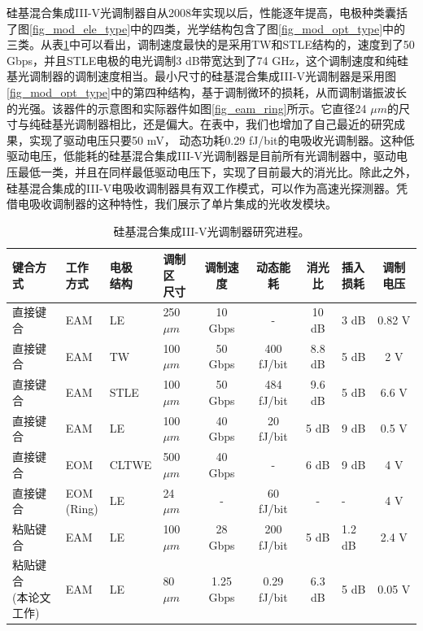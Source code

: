 硅基混合集成III-V光调制器自从2008年实现以后，性能逐年提高，电极种类囊括了图\ref{fig_mod_ele_type}中的四类，光学结构包含了图\ref{fig_mod_opt_type}中的三类。从表\ref{sil_IIIV_mod}中可以看出，调制速度最快的是采用TW和STLE结构的，速度到了50 Gbps，并且STLE电极的电光调制3 dB带宽达到了74 GHz\cite{tang2012over}，这个调制速度和纯硅基光调制器的调制速度相当。最小尺寸的硅基混合集成III-V光调制器是采用图\ref{fig_mod_opt_type}中的第四种结构，基于调制微环的损耗，从而调制谐振波长的光强。该器件的示意图和实际器件如图\ref{fig_eam_ring}所示\cite{Srinivasan2012micro}。它直径24 $\mu m$的尺寸与纯硅基光调制器相比，还是偏大。在表中，我们也增加了自己最近的研究成果，实现了驱动电压只要50 mV， 动态功耗0.29 fJ/bit的电吸收光调制器。这种低驱动电压，低能耗的硅基混合集成III-V光调制器是目前所有光调制器中，驱动电压最低一类，并且在同样最低驱动电压下，实现了目前最大的消光比。除此之外，硅基混合集成的III-V电吸收调制器具有双工作模式，可以作为高速光探测器。凭借电吸收调制器的这种特性，我们展示了单片集成的光收发模块\cite{chen2016wavelength}。
{
	\begin{table}[htb]
		\caption{硅基混合集成III-V光调制器研究进程。}
		\label{sil_IIIV_mod}
		\centering
		\begin{tabular}[t]{p{2cm}p{1cm}p{1cm}p{1.2cm}cccp{1cm}c}
			\hline
			键合方式  & \tabincell{c}{工作 \\ 方式} &\tabincell{c}{电极 \\ 结构}  & \tabincell{c}{调制区 \\ 尺寸} & 调制速度 & 动态能耗 & 消光比 & \tabincell{c}{插入 \\ 损耗} & 调制电压\\
			\hline
			直接键合\cite{kuo2008high} & EAM & LE & 250 $\mu m$ & 10 Gbps & - & 10 dB & 3 dB & 0.82 V\\
			直接键合\cite{tang201150} & EAM & TW & 100 $\mu m$ & 50 Gbps & 400 fJ/bit & 8.8 dB & 5 dB & 2 V\\
			直接键合\cite{tang2012over} & EAM & STLE & 100 $\mu m$ & 50 Gbps & 484 fJ/bit & 9.6 dB & 5 dB & 6.6 V\\
			直接键合\cite{tang2012energy} & EAM & LE & 100 $\mu m$ & 40 Gbps & 20 fJ/bit & 5 dB & 9 dB & 0.5 V\\
			直接键合\cite{chen2011forty} & EOM & CLTWE & 500 $\mu m$ & 40 Gbps & - & 6 dB & 9 dB & 4 V\\
			直接键合\cite{Srinivasan2012micro} & \tabincell{c}{EOM\\(Ring)} & LE & 24 $\mu m$ & - & 60 fJ/bit & - & - & 4 V\\
			粘贴键合\cite{fu20155} & EAM & LE  & 100 $\mu m$ & 28 Gbps & 200 fJ/bit & 5 dB & 1.2 dB & 2.4 V\\
			\tabincell{c}{粘贴键合 \\ (本论文工作)} & EAM & LE  & 80 $\mu m$ & 1.25 Gbps & 0.29 fJ/bit & 6.3 dB & 5 dB & 0.05 V\\
			\hline
		\end{tabular}
	\end{table}
}

